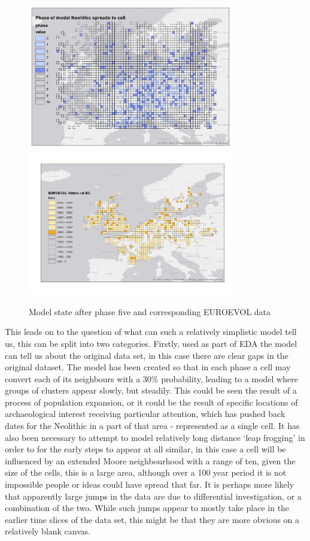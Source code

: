 \begin{figure}
\centering
	\includegraphics[width=0.8\textwidth]{figures/model-5}
	\includegraphics[width=0.8\textwidth]{figures/euroevol-5}
  \caption{Model state after phase five and corresponding EUROEVOL data}
  \label{fig:compare5}
\end{figure}

This leads on to the question of what can such a relatively simplistic model tell us, this can be split into two categories. Firstly, used as part of EDA the model can tell us about the original data set, in this case there are clear gaps in the original dataset. The model has been created so that in each phase a cell may convert each of its neighbours with a 30\% probability, leading to a model where groups of clusters appear slowly, but steadily. This could be seen the result of a process of population expansion, or it could be the result of specific locations of archaeological interest receiving particular attention, which has pushed back dates for the Neolithic in a part of that area - represented as a single cell. It has also been necessary to attempt to model relatively long distance `leap frogging' in order to for the early steps to appear at all similar, in this case a cell will be influenced by an extended Moore neighbourhood with a range of ten, given the size of the cells, this is a large area, although over a 100 year period it is not impossible people or ideas could have spread that far. It is perhaps more likely that apparently large jumps in the data are due to differential investigation, or a combination of the two. While such jumps appear to mostly take place in the earlier time slices of the data set, this might be that they are more obvious on a relatively blank canvas. 

